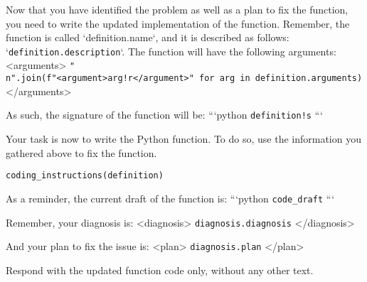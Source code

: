 \begin{tcolorbox}[title={\texttt{Summarize Problem User Instructions}}]
Now that you have identified the problem as well as a plan to fix the function, you need to write the updated implementation of the function.
Remember, the function is called `{definition.name}`, and it is described as follows: `\texttt{{definition.description}}`.
The function will have the following arguments:
<arguments>
\texttt{{"\\n".join(f"<argument>{arg!r}</argument>" for arg in definition.arguments)}}
</arguments>

As such, the signature of the function will be:
```python
\texttt{{definition!s}}
```

Your task is now to write the Python function.
To do so, use the information you gathered above to fix the function.

\texttt{{coding\_instructions(definition)}}

As a reminder, the current draft of the function is:
```python
\texttt{{code\_draft}}
```

Remember, your diagnosis is:
<diagnosis>
\texttt{{diagnosis.diagnosis}}
</diagnosis>

And your plan to fix the issue is:
<plan>
\texttt{{diagnosis.plan}}
</plan>

Respond with the updated function code only, without any other text.
\end{tcolorbox}


